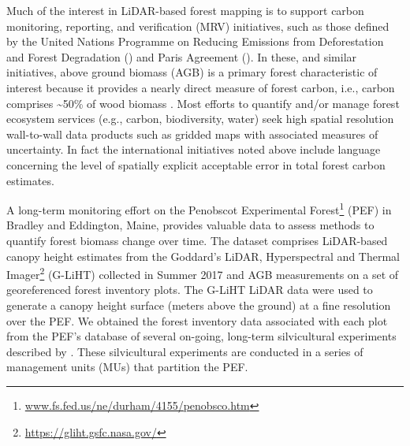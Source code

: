 \documentclass[
  11pt,
]{krantz}
\renewcommand{\href}[2]{#2\footnote{\url{#1}}}
\theoremstyle{definition}
\theoremstyle{definition}
\theoremstyle{definition}
\theoremstyle{definition}
\theoremstyle{remark}
\begin{document}
Much of the interest in LiDAR-based forest mapping is to support carbon monitoring, reporting, and verification (MRV) initiatives, such as those defined by the United Nations Programme on Reducing Emissions from Deforestation and Forest Degradation (\citet{REDD2008}) and Paris Agreement (\citet{paris2015}). In these, and similar initiatives, above ground biomass (AGB) is a primary forest characteristic of interest because it provides a nearly direct measure of forest carbon, i.e., carbon comprises \textasciitilde50\% of wood biomass \citep{west2004}. Most efforts to quantify and/or manage forest ecosystem services (e.g., carbon, biodiversity, water) seek high spatial resolution wall-to-wall data products such as gridded maps with associated measures of uncertainty. In fact the international initiatives noted above include language concerning the level of spatially explicit acceptable error in total forest carbon estimates.

A long-term monitoring effort on the \href{www.fs.fed.us/ne/durham/4155/penobsco.htm}{Penobscot Experimental Forest} (PEF) in Bradley and Eddington, Maine, provides valuable data to assess methods to quantify forest biomass change over time. The dataset comprises LiDAR-based canopy height estimates from the \href{https://gliht.gsfc.nasa.gov/}{Goddard's LiDAR, Hyperspectral and Thermal Imager} (G-LiHT) collected in Summer 2017 and AGB measurements on a set of georeferenced forest inventory plots. The G-LiHT LiDAR data were used to generate a canopy height surface (meters above the ground) at a fine resolution over the PEF. We obtained the forest inventory data associated with each plot from the PEF's database of several on-going, long-term silvicultural experiments described by \citet{Kenefic2015}. These silvicultural experiments are conducted in a series of management units (MUs) that partition the PEF.
\end{document}
